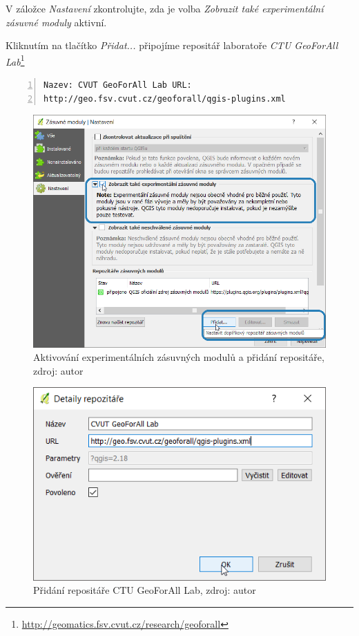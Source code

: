V záložce \textit{Nastavení} zkontrolujte, zda je volba
\textit{Zobrazit také experimentální zásuvné moduly} aktivní.

Kliknutím na tlačítko \textit{Přidat...} připojíme repositář
laboratoře \textit{CTU GeoForAll
Lab}\footnote{\url{http://geomatics.fsv.cvut.cz/research/geoforall}}

\begin{lstlisting}[basicstyle=\footnotesize\ttfamily, backgroundcolor
= \color{light-gray}, numbers=left, columns=fullflexible,
keepspaces=true] Nazev: CVUT GeoForAll Lab URL:
http://geo.fsv.cvut.cz/geoforall/qgis-plugins.xml
\end{lstlisting}

	\begin{figure}[H] \centering
		\includegraphics[width=.85\textwidth]{./pictures/pridani_repositare.png}
		\caption[Aktivování experimentálních zásuvných modulů
a přidání repositáře.]{Aktivování experimentálních zásuvných modulů a
přidání repositáře, zdroj: autor}
		\label{manual_pridani_repozitare}
 	\end{figure}
 	
	\begin{figure}[H] \centering
		\includegraphics[width=.6\textwidth]{./pictures/zadani_repositare.png}
		\caption[Přidání repositáře GeoForAll Lab]{Přidání
repositáře CTU GeoForAll Lab, zdroj: autor}
		\label{manual_zadani_repozitare_geoforall_lab}
 	\end{figure}

